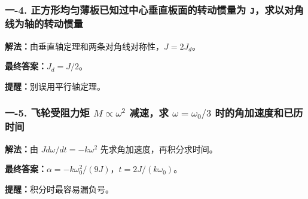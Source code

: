 \documentclass[12pt,a4paper]{ctexart}
\begin{document}
\subsubsection*{一-4. 正方形均匀薄板已知过中心垂直板面的转动惯量为 \texttt{J}，求以对角线为轴的转动惯量}
\begin{tcolorbox}[colback=gray!2!white,colframe=black!60,title={题目}]

\end{tcolorbox}
\begin{tcolorbox}[colback=blue!2!white,colframe=blue!55!black,title={完整答案}]
\textbf{解法：}由垂直轴定理和两条对角线对称性，\(J=2J_d\)。\par
\textbf{最终答案：}\(J_d=J/2\)。\par

\end{tcolorbox}
\begin{tcolorbox}[colback=red!2!white,colframe=red!55!black,title={易错点}]
\textbf{提醒：}别误用平行轴定理。\par
\end{tcolorbox}

\subsubsection*{一-5. 飞轮受阻力矩 \(M∝ω^2\) 减速，求 \(ω=ω_0/3\) 时的角加速度和已历时间}
\begin{tcolorbox}[colback=gray!2!white,colframe=black!60,title={题目}]

\end{tcolorbox}
\begin{tcolorbox}[colback=blue!2!white,colframe=blue!55!black,title={完整答案}]
\textbf{解法：}由 \(J dω/dt=-kω^2\) 先求角加速度，再积分求时间。\par
\textbf{最终答案：}\(α=-kω_0^2/(9J)\)，\(t=2J/(kω_0)\)。\par

\end{tcolorbox}
\begin{tcolorbox}[colback=red!2!white,colframe=red!55!black,title={易错点}]
\textbf{提醒：}积分时最容易漏负号。\par
\end{tcolorbox}
\end{document}

